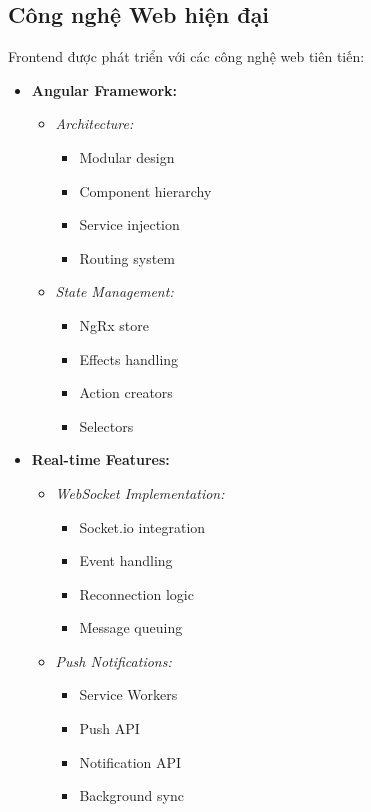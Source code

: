 \subsection{Công nghệ Web hiện đại}
\hspace{0.5cm}Frontend được phát triển với các công nghệ web tiên tiến:

\begin{itemize}
    \item \textbf{Angular Framework:}
    \begin{itemize}
        \item \textit{Architecture:}
        \begin{itemize}
            \item Modular design
            \item Component hierarchy
            \item Service injection
            \item Routing system
        \end{itemize}
        \item \textit{State Management:}
        \begin{itemize}
            \item NgRx store
            \item Effects handling
            \item Action creators
            \item Selectors
        \end{itemize}
    \end{itemize}
    
    \item \textbf{Real-time Features:}
    \begin{itemize}
        \item \textit{WebSocket Implementation:}
        \begin{itemize}
            \item Socket.io integration
            \item Event handling
            \item Reconnection logic
            \item Message queuing
        \end{itemize}
        \item \textit{Push Notifications:}
        \begin{itemize}
            \item Service Workers
            \item Push API
            \item Notification API
            \item Background sync
        \end{itemize}
    \end{itemize}
    

\end{itemize}
